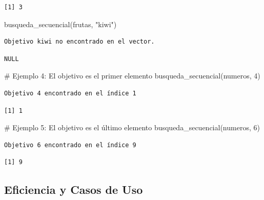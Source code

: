 \documentclass[
  spanish,
  letterpaper,
  DIV=11,
  numbers=noendperiod]{scrreprt}
\newenvironment{Shaded}{\begin{snugshade}}{\end{snugshade}}
\newcommand{\CommentTok}[1]{\textcolor[rgb]{0.37,0.37,0.37}{#1}}
\newcommand{\DecValTok}[1]{\textcolor[rgb]{0.68,0.00,0.00}{#1}}
\newcommand{\FunctionTok}[1]{\textcolor[rgb]{0.28,0.35,0.67}{#1}}
\newcommand{\NormalTok}[1]{\textcolor[rgb]{0.00,0.23,0.31}{#1}}
\newcommand{\StringTok}[1]{\textcolor[rgb]{0.13,0.47,0.30}{#1}}
\begin{document}
\begin{verbatim}
[1] 3
\end{verbatim}

\begin{Shaded}
\begin{Highlighting}[]
\FunctionTok{busqueda\_secuencial}\NormalTok{(frutas, }\StringTok{"kiwi"}\NormalTok{)}
\end{Highlighting}
\end{Shaded}

\begin{verbatim}
Objetivo kiwi no encontrado en el vector.
\end{verbatim}

\begin{verbatim}
NULL
\end{verbatim}

\begin{Shaded}
\begin{Highlighting}[]
\CommentTok{\# Ejemplo 4: El objetivo es el primer elemento}
\FunctionTok{busqueda\_secuencial}\NormalTok{(numeros, }\DecValTok{4}\NormalTok{)}
\end{Highlighting}
\end{Shaded}

\begin{verbatim}
Objetivo 4 encontrado en el índice 1
\end{verbatim}

\begin{verbatim}
[1] 1
\end{verbatim}

\begin{Shaded}
\begin{Highlighting}[]
\CommentTok{\# Ejemplo 5: El objetivo es el último elemento}
\FunctionTok{busqueda\_secuencial}\NormalTok{(numeros, }\DecValTok{6}\NormalTok{)}
\end{Highlighting}
\end{Shaded}

\begin{verbatim}
Objetivo 6 encontrado en el índice 9
\end{verbatim}

\begin{verbatim}
[1] 9
\end{verbatim}

\subsection{Eficiencia y Casos de Uso}\label{eficiencia-y-casos-de-uso}
\end{document}
